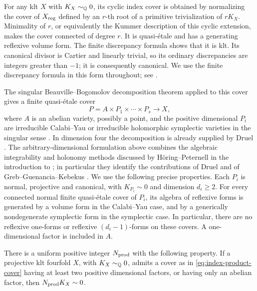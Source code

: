 For any klt \(X\) with \(K_X\sim_{\mathbb Q}0\), its cyclic index cover is obtained
by normalizing the cover of \(X_{\rm reg}\) defined by an \(r\)-th root of
a primitive trivialization of \(rK_X\).  Minimality of \(r\), or equivalently
the Kummer description of this cyclic extension, makes the cover connected
of degree \(r\).  It is quasi-\'etale and has a generating reflexive volume
form.  The finite discrepancy formula shows that it is klt.  Its canonical
divisor is Cartier and linearly trivial, so its ordinary discrepancies are
integers greater than \(-1\); it is consequently canonical.  We use the
finite discrepancy formula in this form throughout; see
\cite[Proposition~5.20]{KollarMori1998}.

The singular Beauville--Bogomolov decomposition theorem applied to this
cover gives a finite quasi-\'etale cover
\begin{equation}\label{eq:index-product-cover}
        P=A\times P_1\times\cdots\times P_s\longrightarrow X,
\end{equation}
where \(A\) is an abelian variety, possibly a point, and the positive
dimensional \(P_i\) are irreducible Calabi--Yau or irreducible holomorphic
symplectic varieties in the singular sense
\cite[Definition~1.4 and Theorem~1.5]{HoringPeternell2019}.
In dimension four the decomposition is already supplied by Druel
\cite[Theorem~1.2]{Druel2018}. The arbitrary-dimensional formulation
above combines the algebraic integrability and
holonomy methods discussed by H\"oring--Peternell in the introduction
to \cite{HoringPeternell2019}; in particular they identify the
contributions of Druel and of Greb--Guenancia--Kebekus
\cite[Theorem~B and Proposition~D]{GGK2019}.
We use the following precise properties.  Each \(P_i\) is normal,
projective and canonical, with \(K_{P_i}\sim0\) and dimension \(d_i\ge2\).
For every connected normal finite quasi-\'etale cover of \(P_i\), its algebra
of reflexive forms is generated by a volume form in the Calabi--Yau case,
and by a generically nondegenerate symplectic form in the symplectic case.
In particular, there are no reflexive one-forms or reflexive
\((d_i-1)\)-forms on these covers.  A one-dimensional factor is included in
\(A\).

\begin{proposition}\label{prop:index-product-case}
There is a uniform positive integer \(N_{\rm prod}\) with the following
property.  If a projective klt fourfold \(X\), with \(K_X\sim_{\mathbb Q}0\),
admits a cover as in \eqref{eq:index-product-cover} having at least two
positive dimensional factors, or having only an abelian factor, then
\(N_{\rm prod}K_X\sim0\).
\end{proposition}

